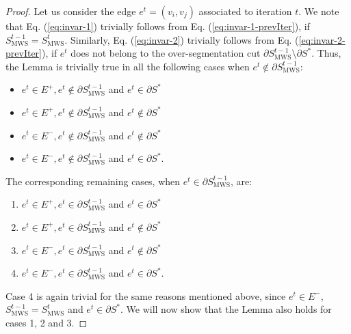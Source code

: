 \begin{proof}
Let us consider the edge $e^{t}=(v_{i},v_{j})$ associated to iteration $t$. We note that Eq. (\ref{eq:invar-1}) trivially follows from Eq. (\ref{eq:invar-1-prevIter}), if $S_{\mathrm{MWS}}^{t-1} = S_{\mathrm{MWS}}^{t}$. Similarly, Eq. (\ref{eq:invar-2}) trivially follows from Eq. (\ref{eq:invar-2-prevIter}), if $e^t$ does not belong to the over-segmentation cut $\partial S_{\mathrm{MWS}}^{t-1} \setminus \partial S^* $. Thus, the Lemma is trivially true in all the following cases when $e^t \notin \partial S_{\mathrm{MWS}}^{t-1}$:
\begin{itemize}
    \item $e^t \in E^{+}, e^t \notin \partial S_{\mathrm{MWS}}^{t-1}$ and $e^t \in \partial S^{*}$
    \item $e^t \in E^{+}, e^t \notin \partial S_{\mathrm{MWS}}^{t-1}$ and  $e^t \notin \partial S^{*}$
     \item $e^t \in E^{-}, e^t \notin \partial S_{\mathrm{MWS}}^{t-1}$ and $e^t \notin \partial S^{*}$
     \item $e^t \in E^{-}, e^t \notin \partial S_{\mathrm{MWS}}^{t-1}$ and $e^t \in \partial S^{*}$.
\end{itemize}
The corresponding remaining cases, when $e^t \in \partial S_{\mathrm{MWS}}^{t-1}$, are:
\begin{enumerate}
    \item $e^t \in E^{+}, e^t \in \partial S_{\mathrm{MWS}}^{t-1}$ and $e^t \in \partial S^{*}$
    \item $e^t \in E^{+}, e^t \in \partial S_{\mathrm{MWS}}^{t-1}$ and  $e^t \notin \partial S^{*}$
    \item $e^t \in E^{-}, e^t \in \partial S_{\mathrm{MWS}}^{t-1}$ and $e^t \notin \partial S^{*}$
    \item $e^t \in E^{-}, e^t \in \partial S_{\mathrm{MWS}}^{t-1}$ and $e^t \in \partial S^{*}$.
\end{enumerate}
Case 4 is again trivial for the same reasons mentioned above, since $e^t\in E^-$, $S_{\mathrm{MWS}}^{t-1} = S_{\mathrm{MWS}}^{t}$ and $e^t \in \partial S^{*}$.
We will now show that the Lemma also holds for cases 1, 2 and 3.

\end{proof}
